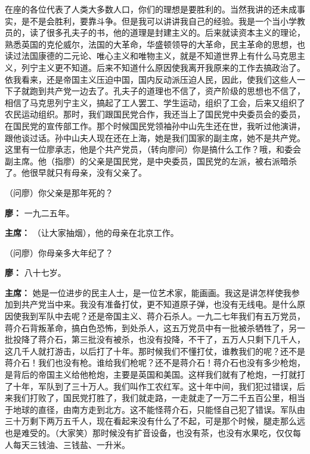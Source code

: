 \begin{list}{}
在座的各位代表了人类大多数人口，你们的理想是要胜利的。当然我讲的还未成事实，是不是会胜利，要靠斗争。但是我可以讲讲我自己的经验。我是一个当小学教员的，读了很多孔夫子的书，他的道理是封建主义的。后来就读资本主义的理论，熟悉英国的克伦威尔，法国的大革命，华盛顿领导的大革命，民主革命的思想，也读过法国康德的二元论、唯心主义和唯物主义，就是不知道世界上有什么马克思主义，列宁主义更不知道。后来不知道什么原因使我离开我原来的工作去搞政治了。依我看来，还是帝国主义压迫中国，国内反动派压迫人民，因此，使我们这些人一下子就跑到共产党一边去了。孔夫子的道理也不信了，资产阶级的思想也不信了，相信了马克思列宁主义，搞起了工人罢工、学生运动，组织了工会，后来又组织了农民运动组织。那时，我们跟国民党合作，我还当上了国民党中央委员会的委员，在国民党的宣传部工作。那个时候国民党领袖孙中山先生还在世，我听过他演讲，跟他谈过话。孙中山夫人现在还在上海，她是我们国家的副主席，她不是共产党。这里有一位廖承志，他是个共产党员，（转向廖问）你是搞什么工作？哦，和委会副主席。他（指廖）的父亲是国民党，是中央委员，国民党的左派，被右派暗杀了。他很早就只有母亲，没有父亲了。

（问廖）你父亲是那年死的？

\item[\textbf{廖：}] 一九二五年。

\item[\textbf{主席：}] （让大家抽烟），他的母亲在北京工作。

（问廖）你母亲多大年纪了？

\item[\textbf{廖：}] 八十七岁。

\item[\textbf{主席：}] 她是一位进步的民主人士，是一位艺术家，能画画。我这是讲怎样使我参加到共产党当中来。我没有准备打仗，更不知道原子弹，也没有无线电。是什么原因使我到军队中去呢？还是帝国主义、蒋介石杀人。一九二七年我们有五万党员，蒋介石背叛革命，搞白色恐怖，到处杀人，这五万党员中有一批被杀牺牲了，另一批投降了蒋介石，第三批没有被杀，也没有投降，不干了，五万人只剩下几千人，这几千人就打游击，以后打了十年。那时候我们不懂打仗，谁教我们的呢？还不是蒋介石！我们也没有枪。谁给我们枪呢？还不是蒋介石！蒋介石也没有多少枪炮，是背后的帝国主义给他枪炮，主要是英国和美国。这样我们就有了枪炮，一打就打了十年，军队到了三十万人。我们叫作工农红军。这十年中间，我们犯过错误，后来我们打败了，国民党打胜了，我们就走路，一走就走了一万二千五百公里，相当于地球的直径，由南方走到北方。这不能怪蒋介石，只能怪自己犯了错误。军队由三十万剩下两万五千人，现在看起来没有什么了不起，可是那个时候，腿走那么远也是难受的。（大家笑）那时候没有扩音设备，也没有茶，也没有水果吃，仅仅每人每天三钱油、三钱盐、一升米。


\end{list}
